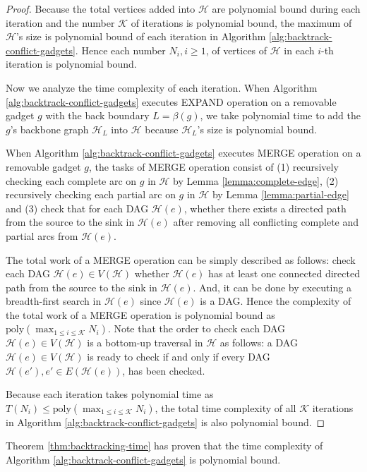 \documentclass[11pt]{article}
\newcommand{\KK}{\mathcal{K}}
\newcommand{\HH}{\mathcal{H}}
\begin{document}
\begin{proof}
Because the total vertices added into $\HH$ are polynomial bound during each iteration
and the number $\KK$ of iterations is polynomial bound,
the maximum of $\HH$'s size is polynomial bound of each iteration
in Algorithm \ref{alg:backtrack-conflict-gadgets}.
Hence each number $N_i, i\geq 1$, of vertices of $\HH$ in
each $i$-th iteration is polynomial bound.

Now we analyze the time complexity of each iteration.
When Algorithm \ref{alg:backtrack-conflict-gadgets} executes EXPAND operation on a removable gadget $g$ with the back boundary $L=\beta(g)$,
we take polynomial time to add the $g$'s backbone graph $\HH_L$ into $\HH$
because $\HH_L$'s size is polynomial bound.

When Algorithm \ref{alg:backtrack-conflict-gadgets} executes MERGE operation on a removable gadget $g$,
the tasks of MERGE operation consist of
(1) recursively checking each complete arc on $g$ in $\HH$
by Lemma \ref{lemma:complete-edge},
(2) recursively checking each partial arc on $g$ in $\HH$ by Lemma \ref{lemma:partial-edge} and
(3) check that for each DAG $\HH(e)$,
whether there exists a directed path
from the source to the sink in $\HH(e)$
after removing all conflicting complete and partial arcs from $\HH(e)$.

The total work of a MERGE operation can be simply described as follows:
check each DAG $\HH(e)\in V(\HH)$ whether $\HH(e)$ has at least one connected
directed path from the source to the sink in $\HH(e)$.
And, it can be done by executing a breadth-first search in $\HH(e)$
since $\HH(e)$ is a DAG. Hence the complexity of the total work of a MERGE operation
is polynomial bound as $\mbox{poly}(\max_{1\leq i\leq \KK}N_i)$.
Note that the order to check each DAG $\HH(e)\in V(\HH)$
is a bottom-up traversal in $\HH$ as follows:
a DAG $\HH(e)\in V(\HH)$ is ready to check if and only if
every DAG $\HH(e'), e'\in E(\HH(e))$, has been checked.



Because each iteration takes polynomial time as $T(N_i)\leq \mbox{poly}(\max_{1\leq i\leq \KK}N_i)$,
the total time complexity of all $\KK$ iterations in Algorithm \ref{alg:backtrack-conflict-gadgets}
is also polynomial bound.

\end{proof}

Theorem \ref{thm:backtracking-time} has proven that
the time complexity of Algorithm \ref{alg:backtrack-conflict-gadgets}
is polynomial bound.
\clearpage
\end{document}
